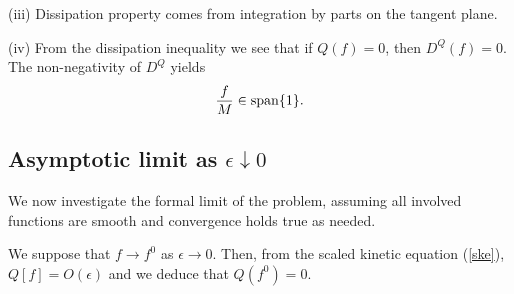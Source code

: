 \documentclass[reqno]{amsart}
\numberwithin{equation}{section}
\theoremstyle{definition}
\theoremstyle{remark}
\begin{document}
(iii) Dissipation property comes from integration by parts on the
tangent plane.

(iv) From the dissipation inequality we see that if $Q(f)=0$, then
$D^Q(f)=0$. The non-negativity of $D^Q$ yields
$$
\frac{f}{M} \in {\rm span}\{1\}.
$$

\subsection{Asymptotic limit as $\epsilon \downarrow 0$ }
We now investigate the formal limit of the problem, assuming all
involved functions are smooth and convergence holds true as needed.

We suppose that $f \to f^0$ as $\epsilon \to 0$. Then, from the scaled kinetic equation (\ref{ske}), $Q[f]=O(\epsilon)$ and we deduce that $Q(f^0)=0$.
\end{document}
